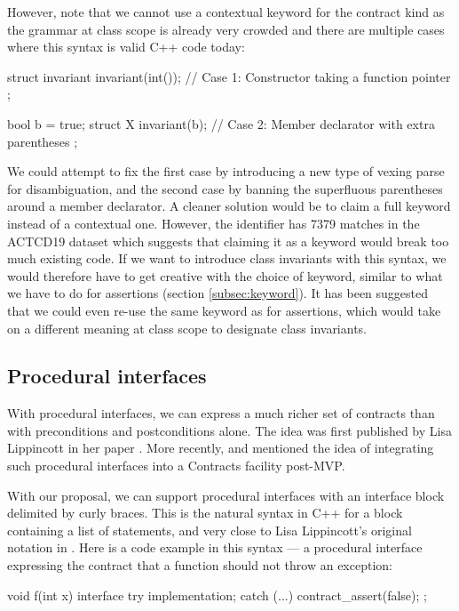 However, note that we cannot use a contextual keyword for the contract kind  as the grammar at class scope is already very crowded and there are multiple cases where this syntax is valid C++ code today:

\begin{codeblock}
struct invariant {
  invariant(int());   // Case 1: Constructor taking a function pointer
};

bool b = true;
struct X {
  invariant(b);   // Case 2: Member declarator with extra parentheses
};
\end{codeblock}

We could attempt to fix the first case by introducing a new type of vexing parse for disambiguation, and the second case by banning the superfluous parentheses around a member declarator. A cleaner solution would be to claim a full keyword instead of a contextual one. However, the identifier  has 7379 matches in the ACTCD19 dataset which suggests that claiming it as a keyword would break too much existing code. If we want to introduce class invariants with this syntax, we would therefore have to get creative with the choice of keyword, similar to what we have to do for assertions (section \ref{subsec:keyword}). It has been suggested that we could even re-use the same keyword as for assertions, which would take on a different meaning at class scope to designate class invariants.

\subsection{Procedural interfaces}
\label{subsec:interfaces}

With procedural interfaces, we can express a much richer set of contracts than with preconditions and postconditions alone. The idea was first published by Lisa Lippincott in her paper \cite{P0465R0}. More recently, \cite{P2885R3} and \cite{P2935R3} mentioned the idea of integrating such procedural interfaces into a Contracts facility post-MVP.

With our proposal, we can support procedural interfaces with an interface block delimited by curly braces. This is the natural syntax in C++ for a block containing a list of statements, and very close to Lisa Lippincott's original notation in \cite{P0465R0}. Here is a code example in this syntax --- a procedural interface expressing the contract that a function should not throw an exception:

\begin{codeblock}
void f(int x)
interface {
  try {
    implementation;
  } 
  catch (...) {
    contract_assert(false);
  }
};
\end{codeblock}

